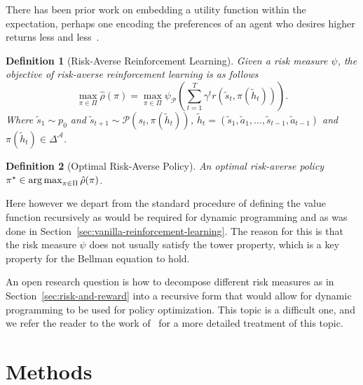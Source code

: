 \documentclass[10pt]{article}
\newtheorem{definition}{Definition}
\renewcommand{\cite}{\citep}
\theoremstyle{plain}
\theoremstyle{remark}
\begin{document}
There has been prior work on embedding a utility function within the expectation, perhaps one encoding the preferences of an agent who
desires higher returns less and less~\cite{howard1972}. 

\begin{definition}[Risk-Averse Reinforcement Learning]\label{def:risk_averse_rl}
        Given a risk measure $\psi$, the objective of risk-averse reinforcement learning is as follows
        \[
                \max_{\pi \in \Pi} \hat{\rho}(\pi) = \max_{\pi \in \Pi} \psi_\mathcal{P} \left( \sum_{t=1}^{T} \gamma^t r(\tilde{s}_t, \pi(\tilde{h}_t)) \right).
        \]
        Where $\tilde{s}_1 \sim p_0$ and $\tilde{s}_{t+1} \sim \mathcal{P}(s_t, \pi(\tilde{h}_t))$, $\tilde{h}_t = (\tilde{s}_1, \tilde{a}_1, \ldots, \tilde{s}_{t-1}, \tilde{a}_{t-1})$ and $\pi(\tilde{h}_t) \in \Delta^\mathcal{A}$.
\end{definition}

\begin{definition}[Optimal Risk-Averse Policy]\label{def:optimal_risk_averse_policy}
        An optimal risk-averse policy $\pi^\star \in \operatorname*{arg\,max}_{\pi \in \Pi} \hat{\rho}(\pi)$.
\end{definition}

Here however we depart from the standard procedure of defining the value function recursively as would be required for dynamic programming and as was done in Section~\ref{sec:vanilla-reinforcement-learning}.
The reason for this is that the risk measure $\psi$ does not usually satisfy the tower property, which is a key property for the Bellman equation to hold.

An open research question is how to decompose different risk measures as in Section~\ref{sec:risk-and-reward} into a recursive form that would allow for dynamic programming to be used for policy optimization.
This topic is a difficult one, and we refer the reader to the work of~\cite{Hau2023OnDP, Bauerle2011, follmer2016} for a more detailed treatment of this topic.


\section{Methods}


\end{document}
